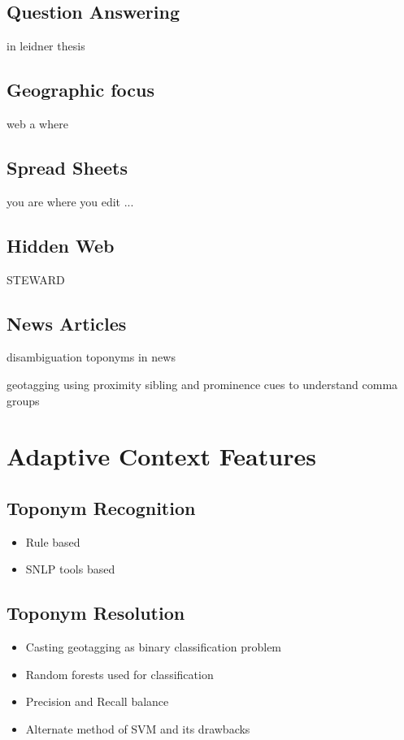 \documentclass[
     11pt,         %
     a4paper,      %
     oneside,
     ]{article}
\begin{document}
\subsection{Question Answering} in leidner thesis
\cite{Leidner:2008:PhD}

\subsection{Geographic focus} web a where \cite{Amitay:2004:WGW:1008992.1009040}

\subsection{Spread Sheets} you are where you edit ...
\subsection{Hidden Web} STEWARD \cite{Lieberman:2007:SAS:1341012.1341045}
\subsection{News Articles} 

disambiguation toponyms in news \cite{Garbin:2005:DTN:1220575.1220621}

geotagging using proximity sibling and prominence cues to understand comma groups \cite{Lieberman:2010:GUP:1722080.1722088}



\section{Adaptive Context Features}\label{sec:acf}


\subsection{Toponym Recognition}\label{subsec:titlepage}
\begin{itemize}
	\item Rule based
	\item SNLP tools based
\end{itemize}
\subsection{Toponym Resolution}
\begin{itemize}
	\item Casting geotagging as binary classification problem
	\item Random forests used for classification
	\item Precision and Recall balance
	\item Alternate method of SVM and its drawbacks
\end{itemize}
\end{document}
